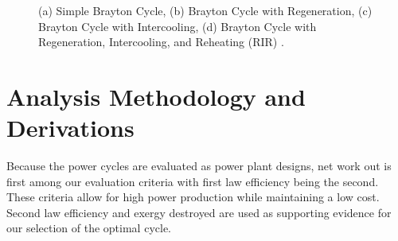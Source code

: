 \documentclass[
	12pt, %
]{brayton_cycle_report_style}
\begin{document}
\begin{figure}%
    \centering
    \qquad
    \qquad
    \qquad
    \caption{(a) Simple Brayton Cycle, (b) Brayton Cycle with Regeneration, (c) Brayton Cycle with Intercooling, (d) Brayton Cycle with Regeneration, Intercooling, and Reheating (RIR) \cite{shahbazi_2023}.}%
    \label{fig:cycles}%
\end{figure}

\section{Analysis Methodology and Derivations}
Because the power cycles are evaluated as power plant designs, net work out is first among our evaluation criteria with first law efficiency being the second. These criteria allow for high power production while maintaining a low cost. Second law efficiency and exergy destroyed are used as supporting evidence for our selection of the optimal cycle.   \\
\end{document}
